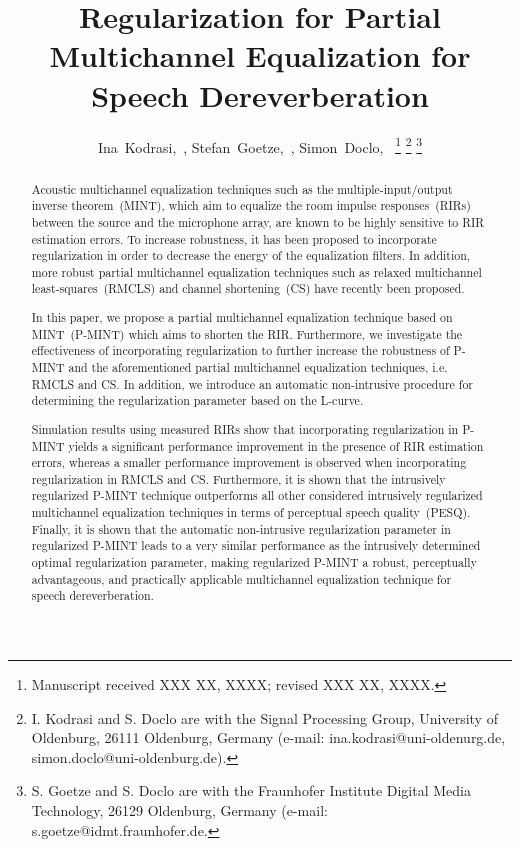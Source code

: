 \documentclass[10pt]{IEEEtran}
\begin{document}
%
\title{Regularization for Partial Multichannel Equalization for Speech Dereverberation}

\author{%
  Ina~Kodrasi,~, Stefan~Goetze,~, Simon~Doclo,~%
  \thanks{Manuscript received XXX XX, XXXX; revised XXX XX, XXXX.}%
  \thanks{I. Kodrasi and S. Doclo are with the Signal Processing Group, University of Oldenburg, 26111 Oldenburg, Germany (e-mail: ina.kodrasi@uni-oldenurg.de, simon.doclo@uni-oldenburg.de).}%
  \thanks{S. Goetze and S. Doclo are with the Fraunhofer Institute Digital Media Technology, 26129 Oldenburg, Germany (e-mail: s.goetze@idmt.fraunhofer.de.}%
}


\maketitle
\newpage

\begin{abstract}
\boldmath
Acoustic multichannel equalization techniques such as the multiple-input/output inverse theorem~(MINT), which aim to equalize the room impulse responses~(RIRs) between the source and the microphone array, are known to be highly sensitive to RIR estimation errors.
To increase robustness, it has been proposed to incorporate regularization in order to decrease the energy of the equalization filters.
In addition, more robust partial multichannel equalization techniques such as relaxed multichannel least-squares~(RMCLS) and channel shortening~(CS) have recently been proposed.

In this paper, we propose a partial multichannel equalization technique based on MINT~(P-MINT) which aims to shorten the RIR.
Furthermore, we investigate the effectiveness of incorporating regularization to further increase the robustness of P-MINT and the aforementioned partial multichannel equalization techniques, i.e. RMCLS and CS.
In addition, we introduce an automatic non-intrusive procedure for determining the regularization parameter based on the L-curve.

Simulation results using measured RIRs show that incorporating regularization in P-MINT yields a significant performance improvement in the presence of RIR estimation errors, whereas a smaller performance improvement is observed when incorporating regularization in RMCLS and CS.
Furthermore, it is shown that the intrusively regularized P-MINT technique outperforms all other considered intrusively regularized multichannel equalization techniques in terms of perceptual speech quality~(PESQ).
Finally, it is shown that the automatic non-intrusive regularization parameter in regularized P-MINT leads to a very similar performance as the intrusively determined optimal regularization parameter, making regularized P-MINT a robust, perceptually advantageous, and practically applicable multichannel equalization technique for speech dereverberation.



\end{abstract}
\end{document}
